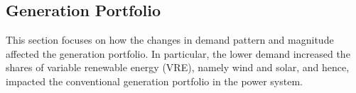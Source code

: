 \documentclass[energies,article,submit,moreauthors,pdftex]{Definitions/mdpi}
\begin{document}








\subsection{Generation Portfolio}\label{sec:Generation portfolio}
This section focuses on how the changes in demand pattern and magnitude affected the generation portfolio. In particular, the lower demand increased the shares of variable renewable energy (VRE), namely wind and solar, and hence, impacted the conventional generation portfolio in the power system. 
\end{document}
